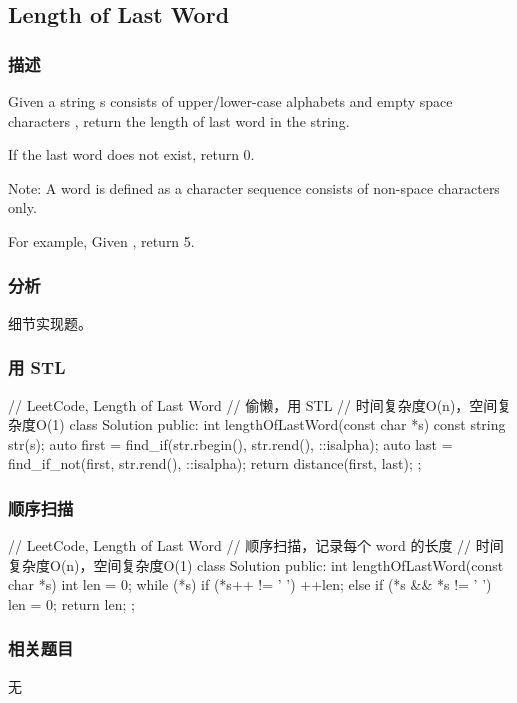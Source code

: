 \subsection{Length of Last Word} %
\label{sec:length-of-last-word}


\subsubsection{描述}
Given a string s consists of upper/lower-case alphabets and empty space characters , return the length of last word in the string.

If the last word does not exist, return 0.

Note: A word is defined as a character sequence consists of non-space characters only.

For example, 
Given ,
return 5.


\subsubsection{分析}
细节实现题。


\subsubsection{用 STL}
\begin{Code}
	// LeetCode, Length of Last Word
	// 偷懒，用 STL
	// 时间复杂度O(n)，空间复杂度O(1)
	class Solution {
		public:
		int lengthOfLastWord(const char *s) {
			const string str(s);
			auto first = find_if(str.rbegin(), str.rend(), ::isalpha);
			auto last = find_if_not(first, str.rend(), ::isalpha);
			return distance(first, last);
		}
	};
\end{Code}


\subsubsection{顺序扫描}
\begin{Code}
	// LeetCode, Length of Last Word
	// 顺序扫描，记录每个 word 的长度
	// 时间复杂度O(n)，空间复杂度O(1)
	class Solution {
		public:
		int lengthOfLastWord(const char *s) {
			int len = 0;
			while (*s) {
				if (*s++ != ' ')
				++len;
				else if (*s && *s != ' ')
				len = 0;
			}
			return len;
		}
	};
\end{Code}


\subsubsection{相关题目}
\begindot
\item 无
\myenddot

